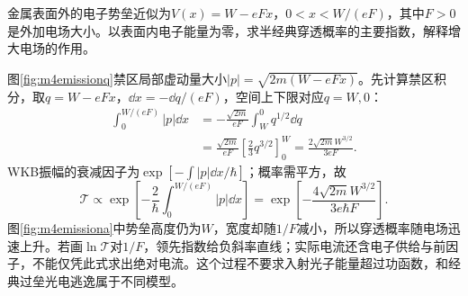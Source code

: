 \begin{exercise}\label{ex:m4fieldemission}
金属表面外的电子势垒近似为$V(x)=W-eFx$，$0<x<W/(eF)$，其中$F>0$是外加电场大小。以表面内电子能量为零，求半经典穿透概率的主要指数，解释增大电场的作用。
\end{exercise}
\begin{solution}
图\ref{fig:m4emissionq}禁区局部虚动量大小$|p|=\sqrt{2m(W-eFx)}$。先计算禁区积分，取$q=W-eFx$，$\dd x=-\dd q/(eF)$，空间上下限对应$q=W,0$：
\begin{align*}
 \int_0^{W/(eF)}|p|\dd x
 &=-\frac{\sqrt{2m}}{eF}\int_W^0q^{1/2}\dd q\\
 &=\frac{\sqrt{2m}}{eF}\left[\frac23q^{3/2}\right]_0^W
 =\frac{2\sqrt{2m}W^{3/2}}{3eF}.
\end{align*}
WKB振幅的衰减因子为$\exp[-\int|p|\dd x/\hbar]$；概率需平方，故
\[
 \mathcal T\propto\exp\left[-\frac2\hbar\int_0^{W/(eF)}|p|\dd x\right]
 =\exp\left[-\frac{4\sqrt{2m}W^{3/2}}{3e\hbar F}\right].
\]
图\ref{fig:m4emissiona}中势垒高度仍为$W$，宽度却随$1/F$减小，所以穿透概率随电场迅速上升。若画$\ln\mathcal T$对$1/F$，领先指数给负斜率直线；实际电流还含电子供给与前因子，不能仅凭此式求出绝对电流。这个过程不要求入射光子能量超过功函数，和经典过垒光电逃逸属于不同模型。
\end{solution}
